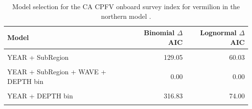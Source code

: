 \documentclass[11pt,
  english,
  a4paper,
]{article}
\begin{document}
\FloatBarrier

\begin{table}

\caption{\label{tab:tab-model-select-cpfvonboard}Model selection for the CA CPFV onboard survey index for vermilion in the northern model .}
\centering
\begin{tabular}[t]{lrr}
\toprule
Model & Binomial $\Delta$AIC & Lognormal $\Delta$AIC\\
\midrule
\cellcolor{gray!6}{1} & \cellcolor{gray!6}{797.52} & \cellcolor{gray!6}{436.25}\\
YEAR + SubRegion & 129.05 & 60.03\\
\cellcolor{gray!6}{YEAR + SubRegion + WAVE} & \cellcolor{gray!6}{120.54} & \cellcolor{gray!6}{58.72}\\
YEAR + SubRegion + WAVE + DEPTH bin & 0.00 & 0.00\\
\cellcolor{gray!6}{YEAR + WAVE + DEPTH bin} & \cellcolor{gray!6}{285.69} & \cellcolor{gray!6}{66.16}\\
\addlinespace
YEAR + DEPTH bin & 316.83 & 74.00\\
\cellcolor{gray!6}{YEAR + SubRegion + DEPTH bin} & \cellcolor{gray!6}{10.87} & \cellcolor{gray!6}{6.06}\\
\bottomrule
\end{tabular}
\end{table}

\FloatBarrier
\end{document}
